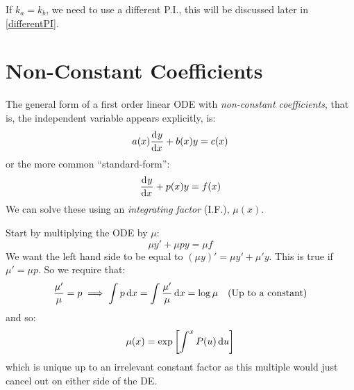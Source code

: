 \documentclass[../main.tex]{subfiles}
\begin{document}
\begin{example}
\begin{center}
  \end{center}
  If $k_a = k_b$, we need to use a different P.I., this will be discussed later in \cref{differentPI}.
\end{example}
\section{Non-Constant Coefficients}
The general form of a first order linear ODE with \textit{non-constant coefficients}, that is, the independent variable appears explicitly, is:
\[
  a(x)\deriv{y}{x} + b(x)y = c(x)
\]
or the more common ``standard-form'':
\[
  \deriv{y}{x} + p(x)y = f(x)
\]
We can solve these using an \textit{integrating factor} (I.F.), $\mu(x)$.

Start by multiplying the ODE by $\mu$:
\[
  \mu y' + \mu py = \mu f
\]
We want the left hand side to be equal to $(\mu y)' = \mu y' + \mu' y$.
This is true if $\mu' = \mu p$.
So we require that:
\[
  \frac{\mu'}{\mu} = p \implies \int p \d{x} = \int \frac{\mu'}{\mu} \d{x} = \log \mu \quad\text{(Up to a constant)}
\]
and so:
\[
  \mu(x) = \exp\left[\int^x P(u) \d{u}\right]
\]
which is unique up to an irrelevant constant factor as this multiple would just cancel out on either side of the DE.
\end{document}
